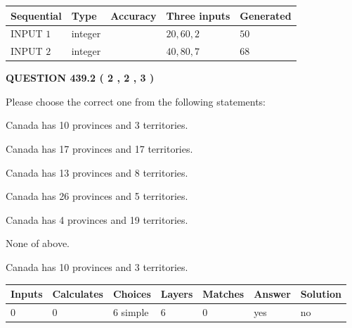 \documentclass[12pt]{article}
\begin{document}
  
\noindent\begin{tabular}{|l|l|l|l|l|}
\hline
 Sequential & Type & Accuracy & Three inputs & Generated \\ 
\hline
 
 
  INPUT $  1 $ & integer &  & $
 20
 , 
 60
 , 
 2
 $ & $ 50 $ 
 \\  \hline  
 
 
  INPUT $  2 $ & integer &  & $
 40
 , 
 80
 , 
 7
 $ & $ 68 $ 
 \\  \hline  
 \end{tabular}
   
   
  
\vspace{0.2in}
  
{\textbf{\Large{QUESTION
439.2 
 ( 2 , 2 , 3 )
}}}
  
  
Please choose the correct one from the following statements:
 
 
Canada has 10  provinces and 3 territories.
 
 
Canada has  17 provinces and  17 territories.
 
 
Canada has  13 provinces and  8 territories.
 
 
Canada has  26 provinces and  5 territories.
 
 
Canada has   4 provinces and  19 territories.
 
 
 None of above.
 
 
\noindent{}
 
 
Canada has 10  provinces and 3 territories.
 
 
\noindent{}
 
 
   
   
   
   
\noindent\begin{tabular}{|l|l|l|l|l|l|l|}
 \hline
Inputs & Calculates & Choices & Layers & Matches & Answer & Solution \\ \hline
 0  & 
 0  & 
 6
  simple  
  & 
 6  & 
 0  & 
  yes & 
  no 
  \\ \hline
 \end{tabular}
   
\end{document}
